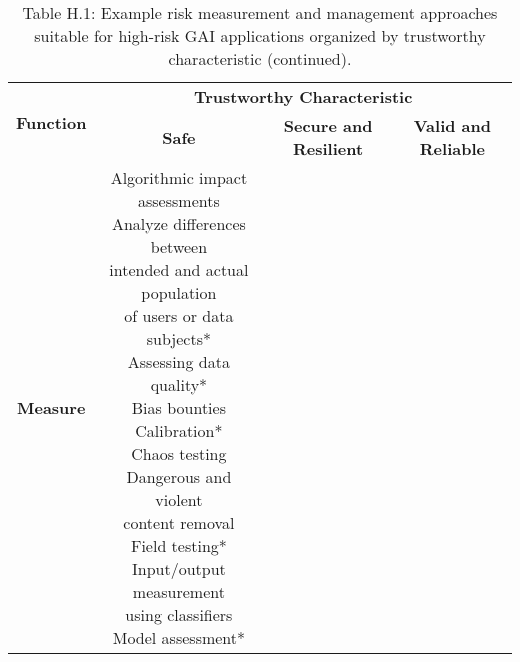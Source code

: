 \documentclass[fleqn]{article}
\begin{document}
\begin{landscape}
\vfill
\raisebox{-10pt}{\makebox[\linewidth]{\thepage}}

\pagebreak
\thispagestyle{empty}

\begin{table}[H]
	\caption*{Table H.1: Example risk measurement and management approaches suitable for high-risk GAI applications organized by trustworthy characteristic (continued).}
	\footnotesize
	\begin{tabular}{|c|c|c|c|}
		\hline
		\multirow{2}{*}{\textbf{Function}} & \multicolumn{3}{|c|}{\textbf{Trustworthy Characteristic}}   \\
		\cline{2-4}
		& \textbf{Safe} & \textbf{Secure and Resilient} & \textbf{Valid and Reliable} \\
		\hline
		\textbf{Measure} & \makecell[l]{
			\textbullet\hspace{3pt} Algorithmic impact assessments\\  	
			\textbullet\hspace{3pt} Analyze differences between\\\hspace{10pt}intended and actual population\\\hspace{10pt}of users or data subjects*\\ 	 	
			\textbullet\hspace{3pt} Assessing data quality*\\  	 	
			\textbullet\hspace{3pt} Bias bounties\\  	
			\textbullet\hspace{3pt} Calibration*\\  	
			\textbullet\hspace{3pt} Chaos testing\\  	
			\textbullet\hspace{3pt} Dangerous and violent
			\\\hspace{10pt}content removal\\  		
			\textbullet\hspace{3pt} Field testing*\\  	
			\textbullet\hspace{3pt} Input/output measurement\\\hspace{10pt}using classifiers \\ 
			\textbullet\hspace{3pt} Model assessment*\\  	
}
\end{tabular}
\end{table}
\end{landscape}
\end{document}
